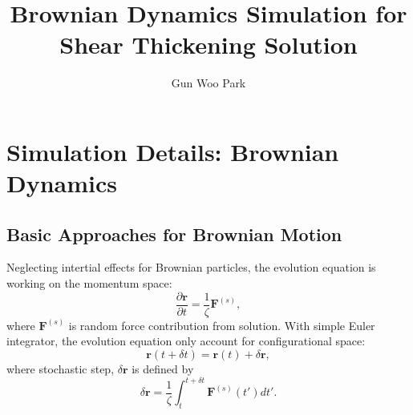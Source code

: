 \documentclass[10pt, a4paper]{report}
\title{Brownian Dynamics Simulation for Shear Thickening Solution}
\author{Gun Woo Park}
\begin{document}
\maketitle
\thispagestyle{empty}
\tableofcontents
\thispagestyle{empty}
\setcounter{page}{1}


\part{Simulation Details: Brownian Dynamics}
\chapter{Basic Approaches for Brownian Motion}
Neglecting intertial effects for Brownian particles, the evolution equation is working on the momentum space:
\begin{equation}
  \frac{\partial \mathbf{r}}{\partial t} = \frac{1}{\zeta}\mathbf{F}^{(s)},\label{eq:evolution_Brownian}
\end{equation}
where $\mathbf{F}^{(s)}$ is random force contribution from solution. With simple Euler integrator, the evolution equation only account for configurational space:
\begin{equation}
\mathbf{r}(t + \delta t) = \mathbf{r}(t) + \delta \mathbf{r},\label{eq:simple_Euler_Brownian}
\end{equation}
where stochastic step, $\delta \mathbf{r}$ is defined by
\begin{equation}
\delta \mathbf{r} = \frac{1}{\zeta}\int_t^{t+\delta t}\mathbf{F}^{(s)}(t')dt'.\label{eq:stochastic_step}
\end{equation}
\end{document}
